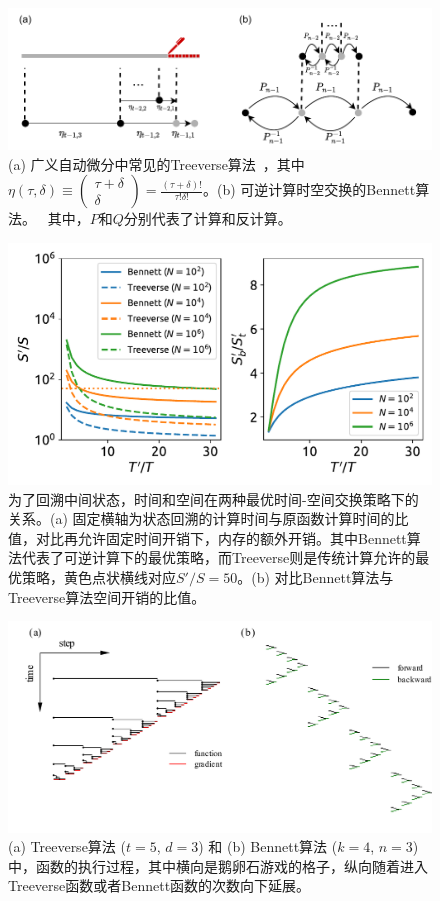 \documentclass[A4,twoside,fontset=ubuntu,UTF8]{ctexart}
\begin{document}
\begin{figure}
    \centerline{\includegraphics[width=0.88\columnwidth,trim={0 0cm 0 0cm},clip]{tradeoff2.pdf}}
    \caption{(a) 广义自动微分中常见的Treeverse算法~\cite{Griewank1992}，其中$\eta(\tau, \delta) \equiv \left(\begin{matrix} \tau + \delta \\ \delta \end{matrix}\right)=\frac{(\tau+\delta)!}{\tau!\delta!}$。(b) 可逆计算时空交换的Bennett算法。~\cite{Bennett1973,Levine1990} 其中，$P$和$Q$分别代表了计算和反计算。}\label{fig:tradeoff}
\end{figure}

\begin{figure}[h]
\centering
\includegraphics[width=0.8\columnwidth]{./fig1.pdf}
    \caption{为了回溯中间状态，时间和空间在两种最优时间-空间交换策略下的关系。(a) 固定横轴为状态回溯的计算时间与原函数计算时间的比值，对比再允许固定时间开销下，内存的额外开销。其中Bennett算法代表了可逆计算下的最优策略，而Treeverse则是传统计算允许的最优策略，黄色点状横线对应$S'/S=50$。(b) 对比Bennett算法与Treeverse算法空间开销的比值。\label{fig:timespace}} 
\end{figure}

\begin{figure}
    \centerline{\includegraphics[width=0.88\columnwidth,trim={0 0cm 0 0cm},clip]{bennett_treeverse_fingerprint.pdf}}
    \caption{(a) Treeverse算法 ($t=5$, $d=3$) 和 (b) Bennett算法 ($k=4$, $n=3$) 中，函数的执行过程，其中横向是鹅卵石游戏的格子，纵向随着进入Treeverse函数或者Bennett函数的次数向下延展。}\label{fig:tradeoff}
\end{figure}
\end{document}
